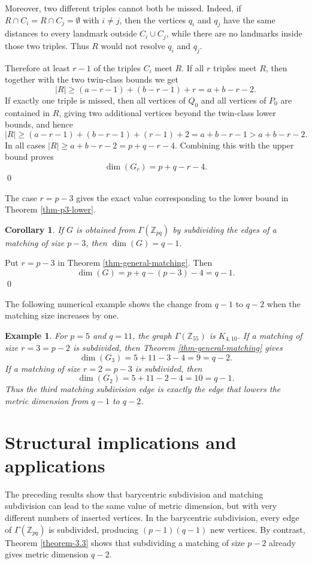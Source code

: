 \documentclass[12pt]{article}
\renewenvironment{proof}{{\bf \noindent Proof.}}{\qed}
\newtheorem{corollary}[theorem]{Corollary}
\newtheorem{example}[theorem]{Example}
\begin{document}
\begin{proof}
Moreover, two different triples cannot both be missed. Indeed, if $R\cap C_i=R\cap C_j=\emptyset$ with $i\neq j$, then the vertices $q_i$ and $q_j$ have the same distances to every landmark outside $C_i\cup C_j$, while there are no landmarks inside those two triples. Thus $R$ would not resolve $q_i$ and $q_j$.

Therefore at least $r-1$ of the triples $C_i$ meet $R$. If all $r$ triples meet $R$, then together with the two twin-class bounds we get
$$
|R|\geq (a-r-1)+(b-r-1)+r=a+b-r-2.
$$
If exactly one triple is missed, then all vertices of $Q_0$ and all vertices of $P_0$ are contained in $R$, giving two additional vertices beyond the twin-class lower bounds, and hence
$$
|R|\geq (a-r-1)+(b-r-1)+(r-1)+2=a+b-r-1>a+b-r-2.
$$
In all cases $|R|\geq a+b-r-2=p+q-r-4$. Combining this with the upper bound proves
$$
\dim(G_r)=p+q-r-4.
$$
\end{proof}

\medskip
\noindent The case $r=p-3$ gives the exact value corresponding to the lower bound in Theorem \ref{thm-p3-lower}.
\begin{corollary}\label{cor-p3-exact}
If $G$ is obtained from $\Gamma(\mathbb Z_{pq})$ by subdividing the edges of a matching of size $p-3$, then $\dim(G)=q-1$.
\end{corollary}

\begin{proof}
Put $r=p-3$ in Theorem \ref{thm-general-matching}. Then
$$
\dim(G)=p+q-(p-3)-4=q-1.
$$
\end{proof}

\medskip
\noindent The following numerical example shows the change from $q-1$ to $q-2$ when the matching size increases by one.
\begin{example}\label{ex-matching-z55}
For $p=5$ and $q=11$, the graph $\Gamma(\mathbb Z_{55})$ is $K_{4,10}$. If a matching of size $r=3=p-2$ is subdivided, then Theorem \ref{thm-general-matching} gives
$$
\dim(G_3)=5+11-3-4=9=q-2.
$$
If a matching of size $r=2=p-3$ is subdivided, then
$$
\dim(G_2)=5+11-2-4=10=q-1.
$$
Thus the third matching subdivision edge is exactly the edge that lowers the metric dimension from $q-1$ to $q-2$.
\end{example}

\section{Structural implications and applications}\label{section 4}

The preceding results show that barycentric subdivision and matching subdivision can lead to the same value of metric dimension, but with very different numbers of inserted vertices. In the barycentric subdivision, every edge of $\Gamma(\mathbb Z_{pq})$ is subdivided, producing $(p-1)(q-1)$ new vertices. By contrast, Theorem \ref{theorem-3.3} shows that subdividing a matching of size $p-2$ already gives metric dimension $q-2$.
\end{document}
